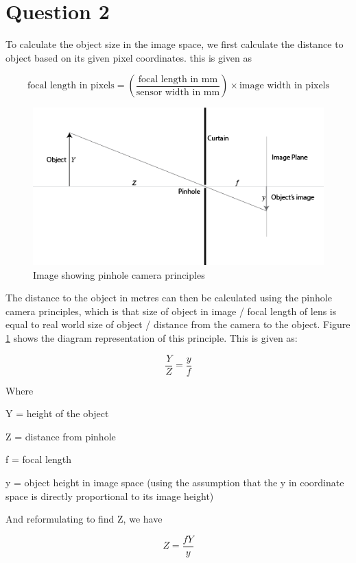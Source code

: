 \documentclass{article}
\begin{document}
\section*{Question 2}

To calculate the object size in the image space, we first calculate the distance to object based on its given pixel coordinates. this is given as 

\[
\text{focal length in pixels} = \left(\frac{\text{focal length in mm}}{\text{sensor width in mm}}\right) \times \text{image width in pixels}
\]

\begin{figure}[h!]
    \centering
    \includegraphics[scale=0.5]{images/objectsize.png}
    \caption{Image showing pinhole camera principles \cite{imageformation}}
    \label{fig:objectsize}
\end{figure}

The distance to the object in metres can then be calculated using the pinhole camera principles, which is that size of object in image / focal length of lens is equal to real world size of object /  distance from the camera to the object. Figure \ref{fig:objectsize} shows the diagram representation of this principle. This is given as: 

\[
\frac{Y}{Z} = \frac{y}{f}
\]

Where

Y = height of the object

Z = distance from pinhole

f = focal length 

y = object height in image space (using the assumption that the y in coordinate space is directly proportional to its image height)

And reformulating to find Z, we have

\[
Z = \frac{fY}{y}
\]
\end{document}
